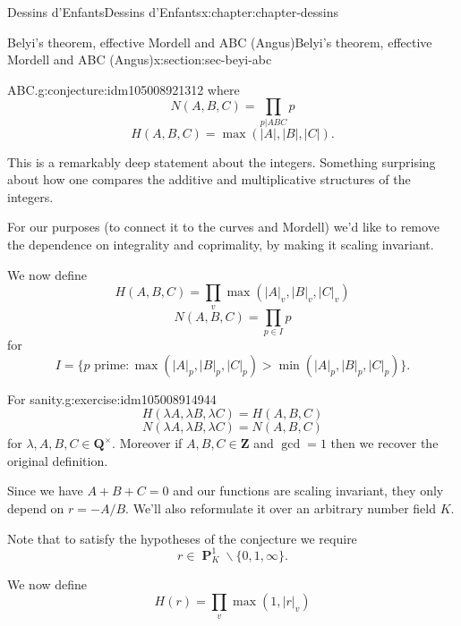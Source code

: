 \documentclass[oneside,10pt,]{book}
\numberwithin{equation}{section}
\newcommand{\units}{^{\times}}
\newcommand{\ZZ}{\mathbf{Z}}
\newcommand{\QQ}{\mathbf{Q}}
\DeclareMathOperator{\PP}{\mathbf{P}}
\newcommand{\gt}{>}
\begin{document}
\begin{chapterptx}{Dessins d'Enfants}{}{Dessins d'Enfants}{}{}{x:chapter:chapter-dessins}
\begin{sectionptx}{Belyi's theorem, effective Mordell and ABC (Angus)}{}{Belyi's theorem, effective Mordell and ABC (Angus)}{}{}{x:section:sec-beyi-abc}
\begin{conjecture}{ABC.}{}{g:conjecture:idm105008921312}
where%
\begin{equation*}
N(A,B,C) =  \prod_{p|ABC} p
\end{equation*}
%
\begin{equation*}
H(A,B,C) = \max(|A|,|B|,|C|)\text{.}
\end{equation*}
%
\end{conjecture}
This is a remarkably deep statement about the integers. Something surprising about how one compares the additive and multiplicative structures of the integers.%
\par
For our purposes (to connect it to the curves and Mordell) we'd like to remove the dependence on integrality and coprimality, by making it scaling invariant.%
\par
We now define%
\begin{equation*}
H(A,B,C) = \prod_{v}\max(|A|_v,|B|_v,|C|_v)
\end{equation*}
%
\begin{equation*}
N(A,B,C) =  \prod_{p\in I} p
\end{equation*}
for%
\begin{equation*}
I = \{p \text{ prime} : \max(|A|_p,|B|_p,|C|_p) \gt \min(|A|_p,|B|_p,|C|_p)\}\text{.}
\end{equation*}
%
\begin{inlineexercise}{For sanity.}{g:exercise:idm105008914944}%
%
\begin{equation*}
H(\lambda A,\lambda B,\lambda C)  = H(A,B,C)
\end{equation*}
%
\begin{equation*}
N(\lambda A,\lambda B,\lambda C)  = N(A,B,C)
\end{equation*}
for \(\lambda, A,B,C \in \QQ\units\). Moreover if \(A,B,C \in \ZZ\) and \(\gcd = 1\) then we recover the original definition.%
\end{inlineexercise}
Since we have \(A+ B+C = 0\) and our functions are scaling invariant, they only depend on \(r=  - A/B\). We'll also reformulate it over an arbitrary number field \(K\).%
\par
Note that to satisfy the hypotheses of the conjecture we require%
\begin{equation*}
r \in \PP^1_K \smallsetminus \{0,1,\infty\}\text{.}
\end{equation*}
%
\par
We now define%
\begin{equation*}
H(r) = \prod_{v}\max(1,|r|_v)
\end{equation*}
%
\begin{equation*}

\end{equation*}
\end{sectionptx}
\end{chapterptx}
\end{document}
